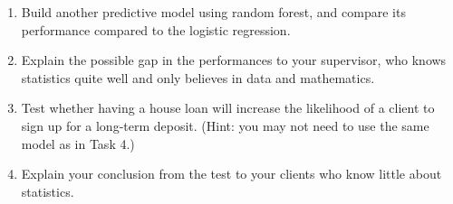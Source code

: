 \documentclass[12pt,]{book}
\providecommand{\tightlist}{%
  \setlength{\itemsep}{0pt}\setlength{\parskip}{0pt}}
\begin{document}
\begin{enumerate}
\def\labelenumi{\arabic{enumi}.}
\setcounter{enumi}{4}
\tightlist
\item
  Build another predictive model using random forest, and compare its
  performance compared to the logistic regression.
\item
  Explain the possible gap in the performances to your supervisor, who
  knows statistics quite well and only believes in data and
  mathematics.\\
\item
  Test whether having a house loan will increase the likelihood of a
  client to sign up for a long-term deposit. (Hint: you may not need to
  use the same model as in Task 4.)
\item
  Explain your conclusion from the test to your clients who know little
  about statistics.
\end{enumerate}


\end{document}
